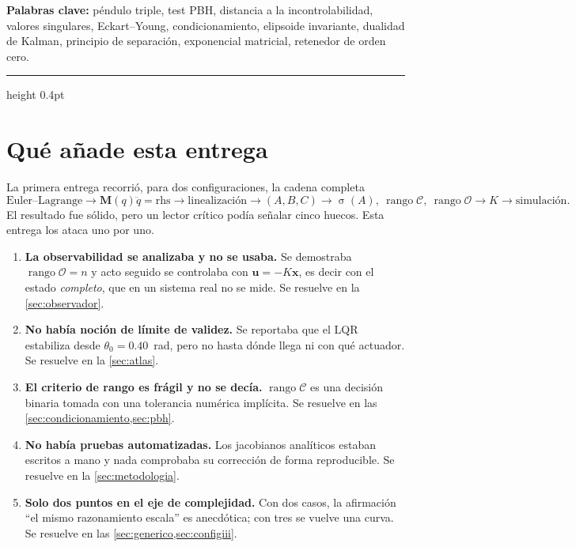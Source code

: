 \documentclass[11pt,letterpaper]{article}
\theoremstyle{definition}
\theoremstyle{plain}
\theoremstyle{remark}
\DeclareMathOperator{\rank}{rango}
\DeclareMathOperator{\spec}{\sigma}
\newcommand{\calC}{\mathcal{C}}
\newcommand{\calO}{\mathcal{O}}
\newcommand{\xv}{\bm{x}}
\newcommand{\uv}{\bm{u}}
\newcommand{\Mm}{\bm{M}}
\begin{document}
\vspace{0.3em}
\noindent\textbf{Palabras clave:}\;
péndulo triple, test PBH, distancia a la incontrolabilidad, valores singulares,
Eckart--Young, condicionamiento, elipsoide invariante, dualidad de Kalman,
principio de separación, exponencial matricial, retenedor de orden cero.
\vspace{0.8em}
\hrule height 0.4pt
\vspace{1.0em}

\section{Qué añade esta entrega}
\label{sec:problema}

La primera entrega recorrió, para dos configuraciones, la cadena completa
\[
\text{Euler--Lagrange} \to \Mm(q)\ddot q=\text{rhs} \to \text{linealización}
\to (A,B,C) \to \spec(A),\ \rank\calC,\ \rank\calO \to K \to \text{simulación}.
\]
El resultado fue sólido, pero un lector crítico podía señalar cinco huecos. Esta
entrega los ataca uno por uno.

\begin{enumerate}
  \item \textbf{La observabilidad se analizaba y no se usaba.} Se demostraba
  $\rank\calO=n$ y acto seguido se controlaba con $\uv=-K\xv$, es decir con el
  estado \emph{completo}, que en un sistema real no se mide. Se resuelve en la
  \cref{sec:observador}.

  \item \textbf{No había noción de límite de validez.} Se reportaba que el LQR
  estabiliza desde $\theta_0=0.40$~rad, pero no hasta dónde llega ni con qué
  actuador. Se resuelve en la \cref{sec:atlas}.

  \item \textbf{El criterio de rango es frágil y no se decía.} $\rank\calC$ es
  una decisión binaria tomada con una tolerancia numérica implícita. Se resuelve
  en las \cref{sec:condicionamiento,sec:pbh}.

  \item \textbf{No había pruebas automatizadas.} Los jacobianos analíticos
  estaban escritos a mano y nada comprobaba su corrección de forma
  reproducible. Se resuelve en la \cref{sec:metodologia}.

  \item \textbf{Solo dos puntos en el eje de complejidad.} Con dos casos, la
  afirmación ``el mismo razonamiento escala'' es anecdótica; con tres se vuelve
  una curva. Se resuelve en las \cref{sec:generico,sec:configiii}.
\end{enumerate}
\end{document}

